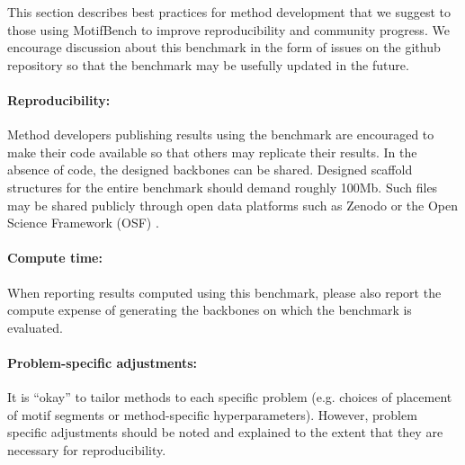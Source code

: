 This section describes best practices for method development that we suggest to
those using MotifBench to improve reproducibility and community progress.
We encourage discussion about this benchmark in the form of issues on the github repository
so that the benchmark may be usefully updated in the future.

\paragraph{Reproducibility:}
Method developers publishing results using the benchmark are encouraged to make their code available so that others may replicate their results.
In the absence of code, the designed backbones can be shared.
Designed scaffold structures for the entire benchmark should demand roughly 100Mb.
Such files may be shared publicly through open data platforms such as Zenodo \citep{zenodo} or the Open Science Framework (OSF) \citep{foster2017open}.

\paragraph{Compute time:}
When reporting results computed using this benchmark,
please also report the compute expense of generating the backbones on which the benchmark is evaluated.

\paragraph{Problem-specific adjustments:}
It is ``okay'' to tailor methods to each specific problem ({e.g.} choices of placement of motif segments or method-specific hyperparameters).
However, problem specific adjustments should be noted and explained to the extent that they are necessary for reproducibility.